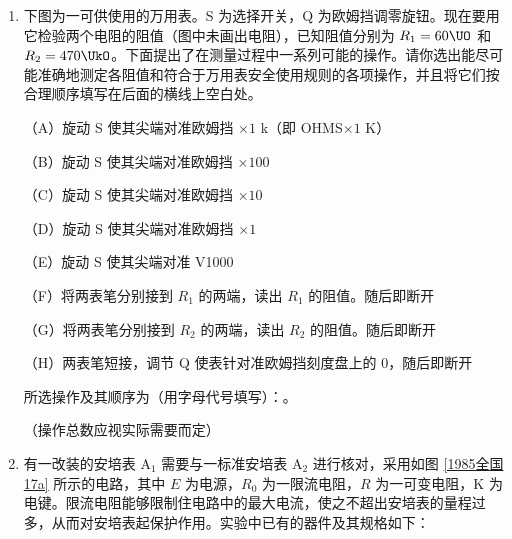 \documentclass[\gkver]{gaokaozhenti}
\begin{document}
\begin{enumerate}
\item
下图为一可供使用的万用表。S 为选择开关，Q 为欧姆挡调零旋钮。现在要用它检验两个电阻的阻值（图中未画出电阻），已知阻值分别为 $R_{1}=60\UO$ 和 $R_{2}=470\UkO$。下面提出了在测量过程中一系列可能的操作。请你选出能尽可能准确地测定各阻值和符合于万用表安全使用规则的各项操作，并且将它们按合理顺序填写在后面的横线上空白处。

（A）旋动 S 使其尖端对准欧姆挡 $\times1$ k（即 OHMS$\times1$ K）

（B）旋动 S 使其尖端对准欧姆挡 $\times100$

（C）旋动 S 使其尖端对准欧姆挡 $\times10$

（D）旋动 S 使其尖端对准欧姆挡 $\times1$

（E）旋动 S 使其尖端对准 V1000

（F）将两表笔分别接到 $R_{1}$ 的两端，读出 $R_{1}$ 的阻值。随后即断开

（G）将两表笔分别接到 $R_{2}$ 的两端，读出 $R_{2}$ 的阻值。随后即断开

（H）两表笔短接，调节 Q 使表针对准欧姆挡刻度盘上的 0，随后即断开

所选操作及其顺序为（用字母代号填写）：。

（操作总数应视实际需要而定）



\item
有一改装的安培表 A$_{1}$ 需要与一标准安培表 A$_{2}$ 进行核对，采用如图 \ref{1985全国17a} 所示的电路，其中 $E$ 为电源，$R_{0}$ 为一限流电阻，$R$ 为一可变电阻，K 为电键。限流电阻能够限制住电路中的最大电流，使之不超出安培表的量程过多，从而对安培表起保护作用。实验中已有的器件及其规格如下：


\end{enumerate}
\end{document}

